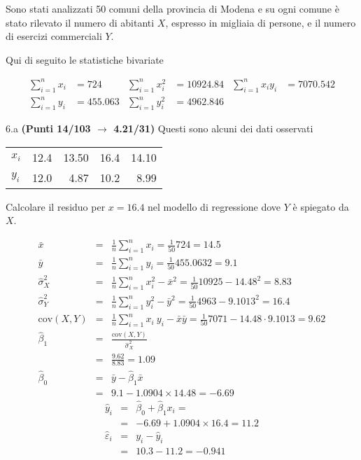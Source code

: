 \documentclass[
  11pt,
]{book}
\theoremstyle{mytheoremstyle}
\theoremstyle{mydefstyle}
\newenvironment{sol}
  {
  \begin{tcolorbox}[enhanced,breakable,arc=0.1mm,boxrule=1pt,colback=white,colframe=iblue,
  title=\bf \fontfamily{lmss}\selectfont \hspace{.5 cm} Soluzione,drop fuzzy shadow]

}{
\end{tcolorbox}
  }
\begin{document}
Sono stati analizzati 50 comuni della provincia di Modena e su ogni comune è stato rilevato
il numero di abitanti \(X\), espresso in migliaia di persone, e il numero di esercizi commerciali \(Y\).

Qui di seguito le statistiche bivariate

\begin{align*}
  \sum_{i=1}^n x_i &= 724 &\sum_{i=1}^n x_i^2 &= 10924.84 &\sum_{i=1}^n x_i y_i &= 7070.542\\
  \sum_{i=1}^n y_i &= 455.063 & \sum_{i=1}^n y_i^2 &= 4962.846 &
\end{align*}

6.a \textbf{(Punti 14/103 \(\rightarrow\) 4.21/31)} Questi sono alcuni dei dati osservati

\begin{table}[H]
\centering
\begin{tabular}{lrrrr}
\toprule
  &  &  &  & \\
\midrule
$x_i$ & 12.4 & 13.50 & 16.4 & 14.10\\
$y_i$ & 12.0 & 4.87 & 10.2 & 8.99\\
\bottomrule
\end{tabular}
\end{table}

Calcolare il residuo per \(x=16.4\) nel modello di regressione dove \(Y\) è spiegato da \(X\).

\begin{sol}
\begin{eqnarray*}
           \bar x &=&\frac 1 n\sum_{i=1}^n x_i = \frac {1}{ 50 }  724 =  14.5 \\
           \bar y &=&\frac 1 n\sum_{i=1}^n y_i = \frac {1}{ 50 }  455.0632 =  9.1 \\
           \hat\sigma_X^2&=&\frac 1 n\sum_{i=1}^n x_i^2-\bar x^2=\frac {1}{ 50 }  10925  - 14.48 ^2= 8.83 \\
           \hat\sigma_Y^2&=&\frac 1 n\sum_{i=1}^n y_i^2-\bar y^2=\frac {1}{ 50 }  4963  - 9.1013 ^2= 16.4 \\
           \text{cov}(X,Y)&=&\frac 1 n\sum_{i=1}^n x_i~y_i-\bar x\bar y=\frac {1}{ 50 }  7071 - 14.48 \cdot 9.1013 = 9.62 \\
           \hat\beta_1 &=& \frac{\text{cov}(X,Y)}{\hat\sigma_X^2} \\
                    &=& \frac{ 9.62 }{ 8.83 }  =  1.09 \\
           \hat\beta_0 &=& \bar y - \hat\beta_1 \bar x\\
                    &=&  9.1 - 1.0904 \times  14.48 = -6.69 
         \end{eqnarray*}\begin{eqnarray*}
\hat y_i &=&\hat\beta_0+\hat\beta_1 x_i=\\ 
&=& -6.69 + 1.0904 \times 16.4 = 11.2 \\ 
\hat \varepsilon_i &=& y_i-\hat y_i\\ 
&=& 10.3 - 11.2 = -0.941  
\end{eqnarray*}

\end{sol}
\end{document}
